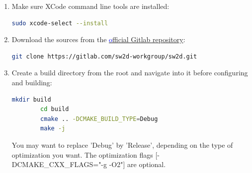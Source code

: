 \begin{enumerate}
    \item Make sure XCode command line tools are installed:\\
    \begin{lstlisting}[language=bash]
        sudo xcode-select --install
    \end{lstlisting}
    \item Download the sources from the \href{https://gitlab.com/sw2d-workgroup/sw2d}{\textcolor{blue}official \swdd Gitlab repository}:
        \begin{lstlisting}[language=bash]
        git clone https://gitlab.com/sw2d-workgroup/sw2d.git
        \end{lstlisting}
    \item Create a build directory from the root and navigate into it before configuring and building:\\
    \begin{lstlisting}[language=bash]
        mkdir build
        cd build
        cmake .. -DCMAKE_BUILD_TYPE=Debug
        make -j
    \end{lstlisting}
    \begin{remark}
    You may want to replace 'Debug' by 'Release', depending on the type of optimization you want. The optimization flags [-DCMAKE\_CXX\_FLAGS="-g -O2"] are optional.
    \end{remark}

\end{enumerate}